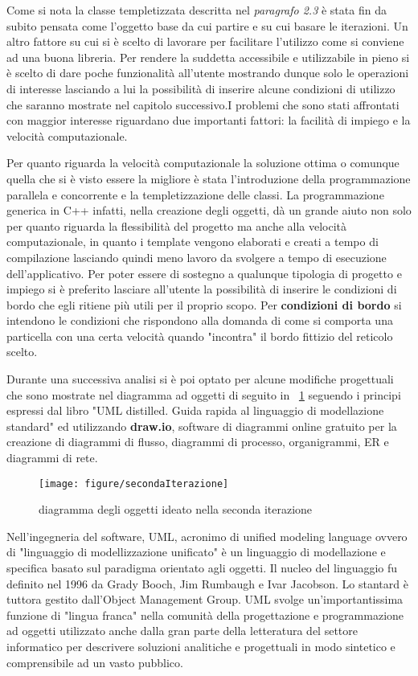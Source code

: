 Come si nota la classe templetizzata descritta nel \textit{paragrafo 2.3} \`e stata fin da subito pensata come l'oggetto base da cui partire e su cui basare le iterazioni. Un altro fattore su cui si \`e scelto di lavorare per facilitare l'utilizzo come si conviene ad una buona libreria. Per rendere la suddetta accessibile e utilizzabile in pieno si \`e scelto di dare poche funzionalit\`a all'utente mostrando dunque solo le operazioni di interesse lasciando a lui la possibilit\`a di inserire alcune condizioni di utilizzo che saranno mostrate nel capitolo successivo.I problemi che sono stati affrontati con maggior interesse riguardano due importanti fattori: la facilit\`a di impiego e la velocit\`a computazionale.

Per quanto riguarda la velocit\`a computazionale la soluzione ottima o comunque quella che si \`e visto essere la migliore \`e stata l'introduzione della programmazione parallela e concorrente e la templetizzazione delle classi.
La programmazione generica in C++ infatti, nella creazione degli oggetti, d\`a un grande aiuto non solo per quanto riguarda la flessibilit\`a del progetto ma anche alla velocit\`a computazionale, in quanto i template vengono elaborati e creati a tempo di compilazione lasciando quindi meno lavoro da svolgere a tempo di esecuzione dell'applicativo.
Per poter essere di sostegno a qualunque tipologia di progetto e impiego si \`e preferito lasciare all'utente la possibilit\`a di inserire le condizioni di bordo che egli ritiene pi\`u utili per il proprio scopo. Per \textbf{condizioni di bordo} si intendono le condizioni che rispondono alla domanda di come si comporta una particella con una certa velocit\`a quando "incontra" il bordo fittizio del reticolo scelto.

Durante una successiva analisi si \`e poi optato per alcune modifiche progettuali che sono mostrate nel diagramma ad oggetti di seguito in \figurename~\ref{fig:secondaiterazione} seguendo i principi espressi dal libro "UML distilled. Guida rapida al linguaggio di modellazione standard"\cite{UML:10} ed utilizzando \textbf{draw.io}, software di diagrammi online gratuito per la creazione di diagrammi di flusso, diagrammi di processo, organigrammi, ER e diagrammi di rete.
\newpage
\begin{figure}[!htb]
	\begin{center}
		\texttt{[image: figure/secondaIterazione]}
	\end{center}
	\caption{diagramma degli oggetti ideato nella seconda iterazione \label{fig:secondaiterazione}}
\end{figure}
Nell'ingegneria del software, UML, acronimo di unified modeling language ovvero di "linguaggio di modellizzazione unificato" \`e un linguaggio di modellazione e specifica basato sul paradigma orientato agli oggetti. Il nucleo del linguaggio fu definito nel 1996 da Grady Booch, Jim Rumbaugh e Ivar Jacobson. Lo stantard \`e tuttora gestito dall'Object Management Group. UML svolge un'importantissima funzione di "lingua franca" nella comunit\`a della progettazione e programmazione ad oggetti utilizzato anche dalla gran parte della letteratura del settore informatico per descrivere soluzioni analitiche e progettuali in modo sintetico e comprensibile ad un vasto pubblico.

